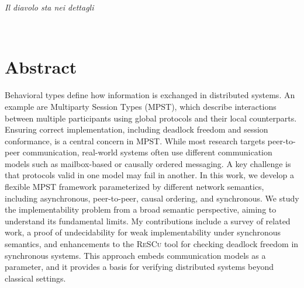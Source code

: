 \documentclass[12pt,a4paper,twoside]{book}
\theoremstyle{definition}
\theoremstyle{definition}
\theoremstyle{definition}
\begin{document}

\thispagestyle{plain}
\restoregeometry
\topmargin=6.5cm
\begin{flushright}
\emph{
\LARGE{Il diavolo sta nei dettagli}%
}
\end{flushright}

\newpage~\thispagestyle{plain}~\newpage

\chapter*{Abstract}
Behavioral types define how information is exchanged in distributed systems.
An example are Multiparty Session Types (MPST), which describe interactions between multiple participants
using global protocols and their local counterparts. Ensuring correct implementation,
including deadlock freedom and session conformance, is a central concern in MPST.
While most research targets peer-to-peer communication, real-world systems often
use different communication models such as mailbox-based or causally ordered messaging.
A key challenge is that protocols valid in one model may fail in another.
In this work, we develop a flexible MPST framework parameterized by different network
semantics, including asynchronous, peer-to-peer, causal ordering, and synchronous.
We study the implementability problem from a broad semantic perspective, aiming to
understand its fundamental limits. My contributions include a survey
of related work, a proof of undecidability for weak implementability under synchronous
semantics, and enhancements to the \textsc{ReSCu} tool for checking deadlock freedom in
synchronous systems. This approach embeds communication models as a parameter, and it
provides a basis for verifying distributed systems beyond classical settings.

\thispagestyle{plain}
\topmargin=-1cm
\tableofcontents
\thispagestyle{empty}
\listoftables
\thispagestyle{empty}
\listoffigures
\thispagestyle{empty}
\lstlistoflistings
\thispagestyle{empty}
\newpage~\newpage


\raggedbottom













\newpage

{}



% 

\newpage


\end{document}
